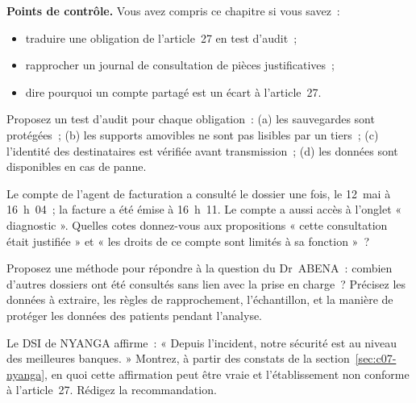 \begin{boxinfo}
\textbf{Points de contrôle.} Vous avez compris ce chapitre si vous savez~:
\begin{itemize}
    \item traduire une obligation de l'article~27 en test d'audit~;
    \item rapprocher un journal de consultation de pièces justificatives~;
    \item dire pourquoi un compte partagé est un écart à l'article~27.
\end{itemize}
\end{boxinfo}

\begin{boxexo}[title={\ding{45}\quad Exercice~7.1. Quel contrôle \niveaubase}]
Proposez un test d'audit pour chaque obligation~: (a) les sauvegardes sont
protégées~; (b) les supports amovibles ne sont pas lisibles par un tiers~;
(c) l'identité des destinataires est vérifiée avant transmission~;
(d) les données sont disponibles en cas de panne.
\end{boxexo}

\begin{boxexo}[title={\ding{45}\quad Exercice~7.2. Lire un journal \niveaumoyen}]
Le compte de l'agent de facturation a consulté le dossier une fois, le
12~mai à 16~h~04~; la facture a été émise à 16~h~11. Le compte a aussi accès
à l'onglet « diagnostic ». Quelles cotes donnez-vous aux propositions
« cette consultation était justifiée » et « les droits de ce compte sont
limités à sa fonction »~?
\end{boxexo}

\begin{boxexo}[title={\ding{45}\quad Exercice~7.3. Combien d'autres dossiers \niveaumoyen}]
Proposez une méthode pour répondre à la question du Dr~ABENA~: combien
d'autres dossiers ont été consultés sans lien avec la prise en charge~?
Précisez les données à extraire, les règles de rapprochement, l'échantillon,
et la manière de protéger les données des patients pendant l'analyse.
\end{boxexo}

\begin{boxexo}[title={\ding{45}\quad Exercice~7.4. Sécurisé mais non conforme \niveauexpert}]
Le DSI de NYANGA affirme~: « Depuis l'incident, notre sécurité est au
niveau des meilleures banques. » Montrez, à partir des constats de la
section~\ref{sec:c07-nyanga}, en quoi cette affirmation peut être vraie et
l'établissement non conforme à l'article~27. Rédigez la recommandation.
\end{boxexo}

